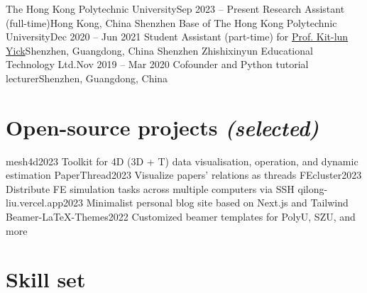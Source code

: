\documentclass[letterpaper,11pt]{article}
\begin{document}
    \resumeColumnsStart
        \resumeEntry
            {The Hong Kong Polytechnic University}{Sep 2023 -- Present}
            {Research Assistant (full-time)}{Hong Kong, China}
        \resumeEntry
            {Shenzhen Base of The Hong Kong Polytechnic University}{Dec 2020 -- Jun 2021}
            {Student Assistant (part-time) for \href{https://research.polyu.edu.hk/en/persons/kit-lun-yick}{Prof. Kit-lun Yick}}{Shenzhen, Guangdong, China}
        \resumeEntry
            {Shenzhen Zhishixinyun Educational Technology Ltd.}{Nov 2019 -- Mar 2020}
            {Cofounder and Python tutorial lecturer}{Shenzhen, Guangdong, China}
    \resumeColumnsEnd

    \section{Open-source projects \emph{(selected)}}

    \resumeColumnsStart
        \resumeEntry
            {mesh4d}{2023}
            {Toolkit for 4D (3D + T) data visualisation, operation, and dynamic estimation}{}
        \resumeEntry
            {PaperThread}{2023}
            {Visualize papers' relations as threads}{}
        \resumeEntry
            {FEcluster}{2023}
            {Distribute FE simulation tasks across multiple computers via SSH}{}
        \resumeEntry
            {qilong-liu.vercel.app}{2023}
            {Minimalist personal blog site based on Next.js and Tailwind}{}
        \resumeEntry
            {Beamer-LaTeX-Themes}{2022}
            {Customized beamer templates for PolyU, SZU, and more}{}
    \resumeColumnsEnd

    \section{Skill set}
\end{document}
